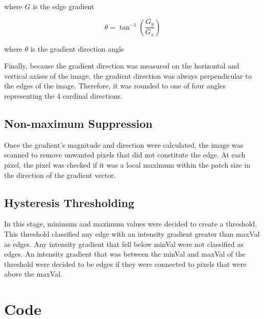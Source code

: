 \documentclass[11pt]{article}
\begin{document}
    {\small \begin{center}
          where $G$ is the edge gradient\\
    \end{center}}
    \begin{equation}
        \theta=\tan^{-1}{\left(\frac{G_y}{G_x}\right)}
    \end{equation}
    {\small \begin{center}
                where $\theta$ is the gradient direction angle\\
    \end{center} }
    \newline
    Finally, because the gradient direction was measured on the horizontal and vertical axises
    of the image, the gradient direction was always perpendicular to the edges of the image.
    Therefore, it was rounded to one of four angles representing the 4 cardinal directions.
    \subsection{Non-maximum Suppression}\label{subsec:non-maximumSuppression}
    Once the gradient's magnitude and direction were calculated, the image was scanned to
    remove unwanted pixels that did not constitute the edge.
    At each pixel, the pixel was checked if it was a local maximum within the patch size
    in the direction of the gradient vector.
    \subsection{Hysteresis Thresholding}\label{subsec:hysteresisThresholding}
    In this stage, minimum and maximum values were decided to create a threshold.
    This threshold classified any edge with an intensity gradient greater than maxVal as edges.
    Any intensity gradient that fell below minVal were not classified as edges.
    An intensity gradient that was between the minVal and maxVal of the threshold were decided
    to be edges if they were connected to pixels that were above the maxVal.

    \section{Code}\label{sec:codeExplanation}
    
\end{document}
